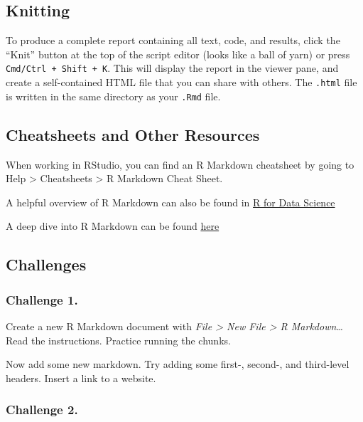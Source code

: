 \documentclass[]{book}
\begin{document}
\subsection{Knitting}\label{knitting}

To produce a complete report containing all text, code, and results,
click the ``Knit'' button at the top of the script editor (looks like a
ball of yarn) or press \texttt{Cmd/Ctrl\ +\ Shift\ +\ K}. This will
display the report in the viewer pane, and create a self-contained HTML
file that you can share with others. The \texttt{.html} file is written
in the same directory as your \texttt{.Rmd} file.

\subsection{Cheatsheets and Other
Resources}\label{cheatsheets-and-other-resources}

When working in RStudio, you can find an R Markdown cheatsheet by going
to Help \textgreater{} Cheatsheets \textgreater{} R Markdown Cheat
Sheet.

A helpful overview of R Markdown can also be found in
\href{https://r4ds.had.co.nz/r-markdown.html}{R for Data Science}

A deep dive into R Markdown can be found
\href{https://bookdown.org/yihui/rmarkdown/}{here}

\subsection{Challenges}\label{challenges-1}

\subsubsection*{Challenge 1.}\label{challenge-1.}

Create a new R Markdown document with \emph{File \textgreater{} New File
\textgreater{} R Markdown\ldots{}} Read the instructions. Practice
running the chunks.

Now add some new markdown. Try adding some first-, second-, and
third-level headers. Insert a link to a website.

\subsubsection*{Challenge 2.}\label{challenge-2.}
\end{document}
